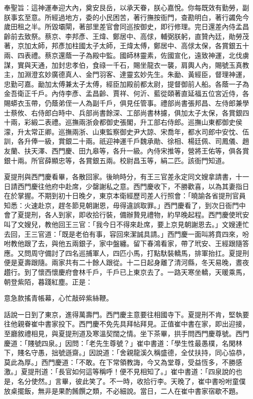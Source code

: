奉聖旨：這神運奉迎大內，奠安艮岳，以承天眷，朕心嘉悅。你每既效有勤勞，副朕事玄至意。所經過地方，委的小民困苦，著行撫按衙門，查勘明白，著行蠲免今歲田租之半。所毀壩閘，著部里差官會同巡按御史，即行修理。完日還差內侍孟昌齡前去致祭。蔡京、李邦彥、王煒、鄭居中、高俅，輔弼朕躬，直贊內廷，勛勞茂著，京加太師，邦彥加柱國太子太師，王煒太傅，鄭居中、高俅太保，各賞銀五十兩、四表禮。蔡京還蔭一子為殿中監。國師林靈素，佐國宣化，遠致神運，北伐虜謀，實與天通，加封忠孝伯，食祿一千石，賜坐龍衣一襲，肩輿人內，賜號玉真教主，加淵澄玄妙廣德真人、金門羽客、達靈玄妙先生。朱勔、黃經臣，督理神運，忠勤可嘉。勔加太傅兼太子太傅，經臣加殿前都太尉，提督御前人船。各蔭一子為金吾衛正千戶。內侍李彥、孟昌齡、賈祥、何沂、藍從頤著直延福五位宮近侍，各賜蟒衣玉帶，仍蔭弟侄一人為副千戶，俱見任管事。禮部尚書張邦昌、左侍郎兼學士蔡攸、右侍郎白時中、兵部尚書餘深、工部尚書林攄，俱加太子太保，各賞銀四十兩，彩緞二表禮。巡撫兩浙僉都御史張閣，升工部右侍郎。巡撫山東都御史侯濛，升太常正卿。巡撫兩浙、山東監察御史尹大諒、宋喬年，都水司郎中安忱、伍訓，各升俸一級，賞銀二十兩。祇迎神運千戶魏承勛、徐相、楊廷佩、司鳳儀、趙友蘭、扶天澤、西門慶、田九皋等，各升一級。內侍宋推等，營將王佑等，俱各賞銀十兩。所官薛顯忠等，各賞銀五兩。校尉昌玉等，絹二匹。該衙門知道。

夏提刑與西門慶看畢，各散回家。後晌時分，有王三官差永定同文嫂拿請書，十一日請西門慶往他府中赴席，少罄謝私之意。西門慶收下，不勝歡喜，以為其妻指日在於掌握。不期到初十日晚夕，東京本衛經歷司差人行照會：「曉諭各省提刑官員知悉：火速赴京，趕冬節見朝謝恩，毋得違誤取罪。」西門慶看了，到次日衙門中會了夏提刑，各人到家，即收拾行裝，備辦贄見禮物，約早晚起程。西門慶使玳安叫了文嫂兒，教他回王三官：「我今日不得來赴席，要上京見朝謝恩去。」文嫂連忙去回，王三官道：「既是老伯有事，容回來潔誠具請。」西門慶一面叫將賁四來，吩咐教他跟了去，與他五兩銀子，家中盤纏。留下春鴻看家，帶了玳安、王經跟隨答應。又問周守備討了四名巡捕軍人，四匹小馬，打點馱裝轎馬，排軍抬扛。夏提刑便是夏壽跟隨。兩家共有二十餘人跟從。十二日起身離了清河縣，冬天易晚，晝夜趲行。到了懷西懷慶府會林千戶，千戶已上東京去了。一路天寒坐轎，天暖乘馬，朝登紫陌，暮踐紅塵。正是：

意急款搖青帳幕，心忙敲碎紫絲鞭。

話說一日到了東京，進得萬壽門。西門慶主意要往相國寺下。夏提刑不肯，堅執要往他親眷崔中書家投下。西門慶不免先具拜帖拜見。正值崔中書在家，即出迎接，至廳敘禮相見，與夏提刑道及寒溫契闊之情。坐下茶畢，拱手問西門慶尊號。西門慶道：「賤號四泉。」因問：「老先生尊號？」崔中書道：「學生性最愚樸，名閑林下，賤名守愚，拙號遜齋。」因說道：「舍親龍溪久稱盛德，全仗扶持，同心協恭，莫此為厚。」西門慶道：「不敢。在下常領教誨，今又為堂尊，受益恆多，不勝感激。」夏提刑道：「長官如何這等稱呼！便不見相知了。」崔中書道：「四泉說的也是，名分使然。」言畢，彼此笑了。不一時，收拾行李。天晚了，崔中書吩咐童僕放桌擺飯，無非是果酌餚饌之類，不必細說。當日，二人在崔中書家宿歇不題。


